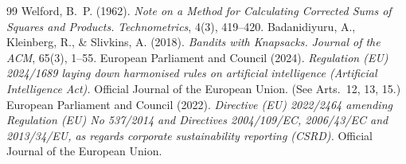 \documentclass[11pt]{article}
\theoremstyle{plain}
\theoremstyle{definition}
\theoremstyle{remark}
\begin{document}
\begin{thebibliography}{99}
 Welford, B.~P. (1962). \emph{Note on a Method for Calculating Corrected Sums of Squares and Products.} \emph{Technometrics}, 4(3), 419--420.
 Badanidiyuru, A., Kleinberg, R., \& Slivkins, A. (2018). \emph{Bandits with Knapsacks.} \emph{Journal of the ACM}, 65(3), 1--55.
 European Parliament and Council (2024). \emph{Regulation (EU) 2024/1689 laying down harmonised rules on artificial intelligence (Artificial Intelligence Act).} Official Journal of the European Union. (See Arts.~12, 13, 15.)
 European Parliament and Council (2022). \emph{Directive (EU) 2022/2464 amending Regulation (EU) No 537/2014 and Directives 2004/109/EC, 2006/43/EC and 2013/34/EU, as regards corporate sustainability reporting (CSRD).} Official Journal of the European Union.
\end{thebibliography}
\end{document}
